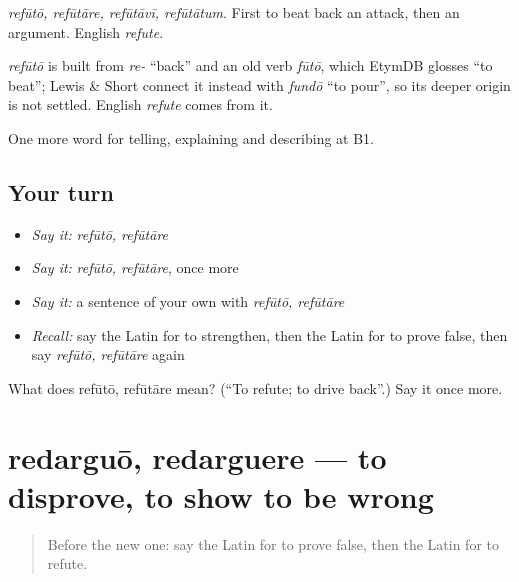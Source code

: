 \emph{refūtō, refūtāre, refūtāvī, refūtātum}. First to beat back an attack, then an argument. English \emph{refute}.

\begin{cousinweb}
\emph{refūtō} is built from \emph{re-} \textquotedblleft{}back\textquotedblright{} and an old verb \emph{fūtō}, which EtymDB glosses \textquotedblleft{}to beat\textquotedblright{}; Lewis \& Short connect it instead with \emph{fundō} \textquotedblleft{}to pour\textquotedblright{}, so its deeper origin is not settled. English \emph{refute} comes from it.
\end{cousinweb}

\begin{grammarlens}[title={What you've built}]
One more word for telling, explaining and describing at B1.
\end{grammarlens}

\subsection*{Your turn}
\begin{itemize}
\raggedright
  \item \emph{Say it:} \emph{refūtō, refūtāre}
  \item \emph{Say it:} \emph{refūtō, refūtāre}, once more
  \item \emph{Say it:} a sentence of your own with \emph{refūtō, refūtāre}
  \item \emph{Recall:} say the Latin for to strengthen, then the Latin for to prove false, then say \emph{refūtō, refūtāre} again
\end{itemize}

\begin{tcolorbox}[breakable,colback=teal!4,colframe=teal!35!black,title={Before you move on}]
What does refūtō, refūtāre mean? (\textquotedblleft{}To refute; to drive back\textquotedblright{}.) Say it once more.
\end{tcolorbox}
\section[redarguō, redarguere]{redarguō, redarguere — to disprove, to show to be wrong}

\label{lesson:LA-C362-redarguo}



\begin{quote}
Before the new one: say the Latin for to prove false, then the Latin for to refute.
\end{quote}

